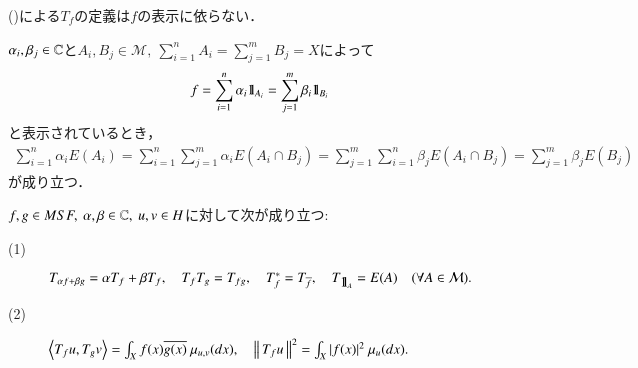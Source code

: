 	\begin{screen}
		\begin{lem}
			()による$T_f$の定義は$f$の表示に依らない．
		\end{lem}	
	\end{screen}
	
	\begin{prf}
			$\alpha_i ,\beta_j \in \mathbb{C}$と$A_i,B_j \in \mathcal{M},\ \sum_{i=1}^{n} A_i = \sum_{j=1}^{m} B_j = X$によって
			\begin{align}
				f = \sum_{i=1}^{n} \alpha_i \mbox{1}\hspace{-0.25em}\mbox{l}_{A_i} = \sum_{j=1}^{m} \beta_i \mbox{1}\hspace{-0.25em}\mbox{l}_{B_i}
			\end{align}
			と表示されているとき，
			\begin{align}
				\sum_{i=1}^{n} \alpha_i E(A_i)
				= \sum_{i=1}^{n} \sum_{j=1}^{m} \alpha_i E(A_i \cap B_j)
				= \sum_{j=1}^{m} \sum_{i=1}^{n} \beta_j E(A_i \cap B_j)
				= \sum_{j=1}^{m} \beta_j E(B_j)
			\end{align}
			が成り立つ．
		\QED
	\end{prf}
	
	\begin{screen}
		\begin{lem}
			$f,g \in MSF,\ \alpha,\beta \in \mathbb{C},\ u,v \in H$に対して次が成り立つ:
			\begin{description}
				\item[(1)] 
					$T_{\alpha f + \beta g} = \alpha T_f + \beta T_f,
						\quad T_f T_g = T_{fg},
						\quad T_f^* = T_{\overline{f}},
						\quad T_{\mbox{1}\hspace{-0.25em}\mbox{l}_A} = E(A) \quad (\forall A \in \mathcal{M}).$
				
				\item[(2)] 
					$\inprod<T_f u, T_g v> = \int_X f(x) \conj{g(x)}\ \mu_{u,v}(dx), 
						\quad \Norm{T_f u}{}^2 = \int_X |f(x)|^2\ \mu_u(dx).$
			\end{description}
			\label{lem:MSF_properties_of_T_f}
		\end{lem}
	\end{screen}
	
